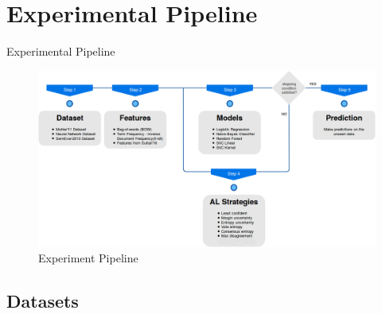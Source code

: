 \documentclass{beamer}
\begin{document}
\section{Experimental Pipeline}
\begin{frame}{Experimental Pipeline}
	
	\textbf{}
	
		\begin{figure}[!htb]
			\centering
			\includegraphics[scale=0.26]{images/experiment_pipeline}
			\caption{Experiment Pipeline}
			\label{experiment_pipeline}
		\end{figure}
\end{frame}



\subsection{Datasets}
\end{document}
